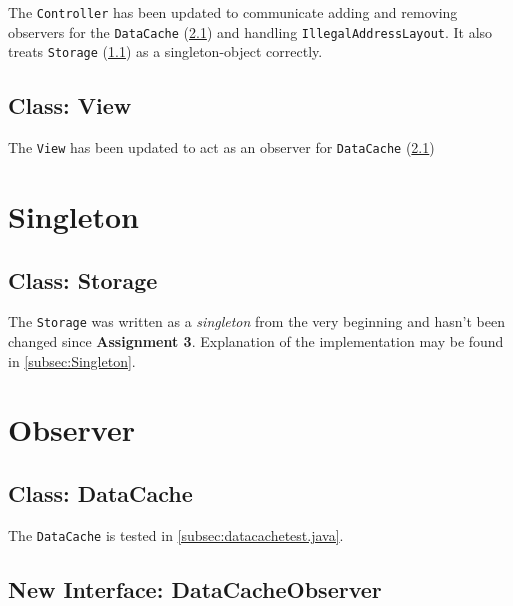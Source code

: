 \documentclass[a4paper]{scrreprt}
\begin{document}
The \texttt{Controller} has been updated to communicate adding and removing observers for the \texttt{DataCache} (\ref{subsec:datacache.java}) and handling \texttt{IllegalAddressLayout}. It also treats \texttt{Storage} (\ref{subsec:storage.java}) as a singleton-object correctly.



\subsection{Class: View}
\label{subsec:view.java}

The \texttt{View} has been updated to act as an observer for \texttt{DataCache} (\ref{subsec:datacache.java})



\section{Singleton}

\subsection{Class: Storage}
\label{subsec:storage.java}

The \texttt{Storage} was written as a \textit{singleton} from the very beginning and hasn't been changed since \textbf{Assignment 3}. Explanation of the implementation may be found in \ref{subsec:Singleton}.



\section{Observer}

\subsection{Class: DataCache}
\label{subsec:datacache.java}

The \texttt{DataCache} is tested in \ref{subsec:datacachetest.java}.



\subsection{New Interface: DataCacheObserver}
\label{subsec:datacacheobserver.java}
\end{document}
